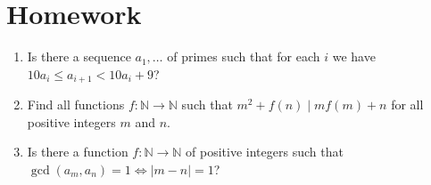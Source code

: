 \documentclass{article}
\newcommand\Nn{\mathbb{N}}
\begin{document}
\section{Homework}
\begin{enumerate}
  \item Is there a sequence $a_1,\ldots$ of primes such that for each $i$ we
    have $10 a_i\le a_{i+1}<10a_i+9$?
  \item Find all functions $f:\Nn\to\Nn$ such that $m^2+f(n)\mid
    mf(m)+n$ for all positive integers $m$ and $n$.
  \item Is there a function $f:\Nn\to\Nn$ of positive integers such that
    $\gcd(a_m,a_n)=1\iff |m-n|=1$?
\end{enumerate}
\end{document}
